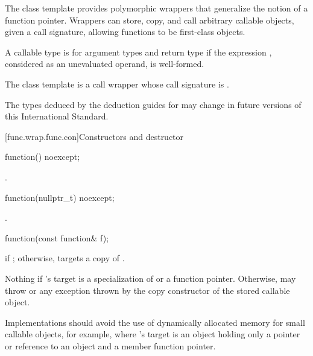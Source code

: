 \pnum
The  class template provides polymorphic wrappers that
generalize the notion of a function pointer. Wrappers can store, copy,
and call arbitrary callable objects, given a call
signature, allowing functions to be first-class objects.

\pnum
{}%
A callable type 
is  for argument
types 
and return type 
if the expression
,
considered as an unevaluated operand, is
well-formed.

\pnum
The  class template is a call
wrapper whose call signature
is .

\pnum
\begin{note}
The types deduced by the deduction guides for 
may change in future versions of this International Standard.
\end{note}

[func.wrap.func.con]{Constructors and destructor}

%
\begin{itemdecl}
function() noexcept;
\end{itemdecl}

\begin{itemdescr}
\pnum
\ensures
{}.
\end{itemdescr}

%
\begin{itemdecl}
function(nullptr_t) noexcept;
\end{itemdecl}

\begin{itemdescr}
\pnum
\ensures
{}.
\end{itemdescr}

%
\begin{itemdecl}
function(const function& f);
\end{itemdecl}

\begin{itemdescr}
\pnum
\ensures
{} if ; otherwise,
 targets a copy of .

\pnum
\throws
Nothing if 's target is
a specialization of  or
a function pointer. Otherwise, may throw 
or any exception thrown by the copy constructor of the stored callable object.
\begin{note}
Implementations should avoid the use of
dynamically allocated memory for small callable objects, for example, where
's target is an object holding only a pointer or reference
to an object and a member function pointer.
\end{note}
\end{itemdescr}

